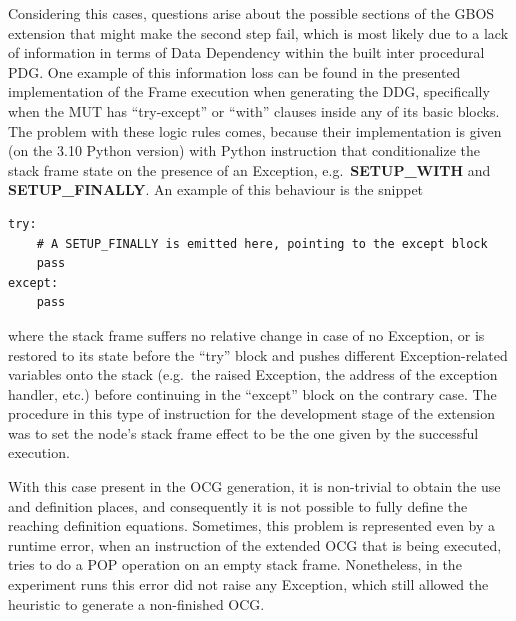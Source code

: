 \documentclass[%
  chapterprefix=false,%
  open=right,%
  twoside=true,%
  paper=a4,%
  logofile={Figures/logo.png},%
  thesistype=master,%
  UKenglish,%
]{se2thesis}
\begin{document}
Considering this cases, questions arise about the possible sections of the GBOS extension that might make the second step fail, which is most likely due to a lack of information in terms of Data Dependency within the built inter procedural PDG.\@
One example of this information loss can be found in the presented implementation of the Frame execution when generating the DDG, specifically when the MUT has ``try-except'' or ``with'' clauses inside any of its basic blocks.
The problem with these logic rules comes, because their implementation is given (on the 3.10 Python version) with Python instruction that conditionalize the stack frame state on the presence of an Exception, e.g.~\textbf{SETUP\_WITH} and \textbf{SETUP\_FINALLY}.
An example of this behaviour is the snippet

\begin{verbatim}
try:
    # A SETUP_FINALLY is emitted here, pointing to the except block
    pass
except:
    pass
\end{verbatim}

where the stack frame suffers no relative change in case of no Exception, or is restored to its state before the ``try'' block and pushes different Exception-related variables onto the stack (e.g.~the raised Exception, the address of the exception handler, etc.) before continuing in the ``except'' block on the contrary case.  
The procedure in this type of instruction for the development stage of the extension was to set the node's stack frame effect to be the one given by the successful execution.

With this case present in the OCG generation, it is non-trivial to obtain the use and definition places, and consequently it is not possible to fully define the reaching definition equations.
Sometimes, this problem is represented even by a runtime error, when an instruction of the extended OCG that is being executed, tries to do a POP operation on an empty stack frame.  
Nonetheless, in the experiment runs this error did not raise any Exception, which still allowed the heuristic to generate a non-finished OCG.\@ 
\end{document}
